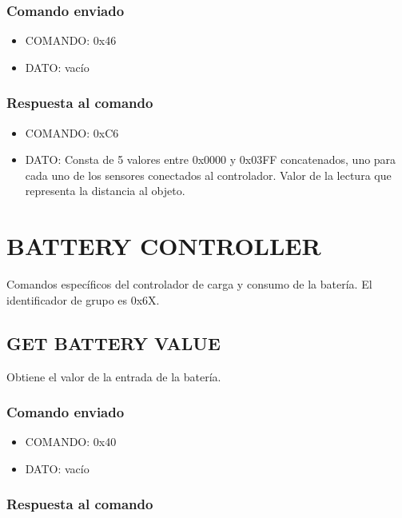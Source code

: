 \documentclass[a4paper,10pt]{article}
\begin{document}
\subsubsection*{Comando enviado}

\begin{itemize}
	\item{COMANDO:} 0x46
	\item{DATO:} vac\'io
\end{itemize}

\subsubsection*{Respuesta al comando}

\begin{itemize}
	\item{COMANDO:} 0xC6
	\item{DATO:} Consta de 5 valores entre 0x0000 y 0x03FF concatenados, uno para cada uno de los sensores conectados al controlador.
	Valor de la lectura que representa la distancia al objeto.
\end{itemize}

\section{BATTERY CONTROLLER} 
\label{grupo_battery_controller}

Comandos espec\'ificos del controlador de carga y consumo de la bater\'ia.
El identificador de grupo es 0x6X.

\subsection{GET BATTERY VALUE}
\label{get_battery_value}

Obtiene el valor de la entrada de la bater\'ia.

\subsubsection*{Comando enviado}

\begin{itemize}
	\item{COMANDO:} 0x40
	\item{DATO:} vac\'io
\end{itemize}

\subsubsection*{Respuesta al comando}
\end{document}
